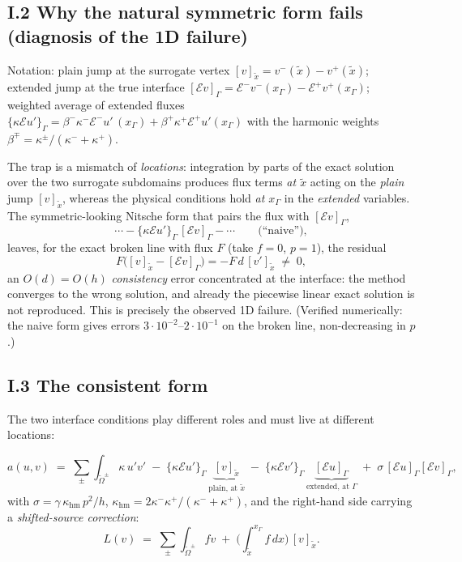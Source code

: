 \subsection*{I.2 Why the natural symmetric form fails (diagnosis of the 1D failure)}

Notation: plain jump at the surrogate vertex $[v]_{\tilde x} = v^-(\tilde
x) - v^+(\tilde x)$; extended jump at the true interface $[\mathcal E
v]_\Gamma = \mathcal E^- v^- (x_\Gamma) - \mathcal E^+ v^+(x_\Gamma)$;
weighted average of extended fluxes $\{\kappa \mathcal E u'\}_\Gamma =
\beta^- \kappa^- \mathcal E^- u'\,(x_\Gamma) + \beta^+ \kappa^+ \mathcal
E^+ u'(x_\Gamma)$ with the harmonic weights $\beta^\mp =
\kappa^\pm/(\kappa^-{+}\kappa^+)$.

The trap is a mismatch of \emph{locations}: integration by parts of the
exact solution over the two surrogate subdomains produces flux terms
\emph{at $\tilde x$} acting on the \emph{plain} jump $[v]_{\tilde x}$,
whereas the physical conditions hold \emph{at $x_\Gamma$} in the
\emph{extended} variables. The symmetric-looking Nitsche form that pairs
the flux with $[\mathcal E v]_\Gamma$,
\[
  \cdots - \{\kappa \mathcal E u'\}_\Gamma\, [\mathcal E v]_\Gamma - \cdots
  \qquad \text{(``naive'')},
\]
leaves, for the exact broken line with flux $F$ (take $f=0$, $p=1$), the
residual
\[
  F\big( [v]_{\tilde x} - [\mathcal E v]_\Gamma \big)
  = -F\, d\, [v']_{\tilde x} \;\neq\; 0 ,
\]
an $O(d) = O(h)$ \emph{consistency} error concentrated at the interface:
the method converges to the wrong solution, and already the piecewise
linear exact solution is not reproduced. This is precisely the observed 1D
failure. (Verified numerically: the naive form gives errors
$3\cdot10^{-2}$--$2\cdot10^{-1}$ on the broken line, non-decreasing in
$p$.)

\subsection*{I.3 The consistent form}

The two interface conditions play different roles and must live at
different locations:

\begin{equation}
  a(u,v) \;=\; \sum_\pm \int_{\tilde\Omega^\pm} \kappa\, u' v'
  \;-\; \{\kappa \mathcal E u'\}_\Gamma\, \underbrace{[v]_{\tilde x}}_{\text{plain, at }\tilde x}
  \;-\; \{\kappa \mathcal E v'\}_\Gamma\, \underbrace{[\mathcal E u]_\Gamma}_{\text{extended, at }\Gamma}
  \;+\; \sigma\, [\mathcal E u]_\Gamma [\mathcal E v]_\Gamma ,
  \label{eq:sim_form}
\end{equation}
with $\sigma = \gamma\, \kappa_{\mathrm{hm}}\, p^2/h$,
$\kappa_{\mathrm{hm}} = 2\kappa^-\kappa^+/(\kappa^-{+}\kappa^+)$, and the
right-hand side carrying a \emph{shifted-source correction}:
\begin{equation}
  L(v) \;=\; \sum_\pm \int_{\tilde\Omega^\pm} f v
  \;+\; \Big( \int_{\tilde x}^{x_\Gamma} f \, dx \Big)\, [v]_{\tilde x} .
  \label{eq:sim_rhs}
\end{equation}

